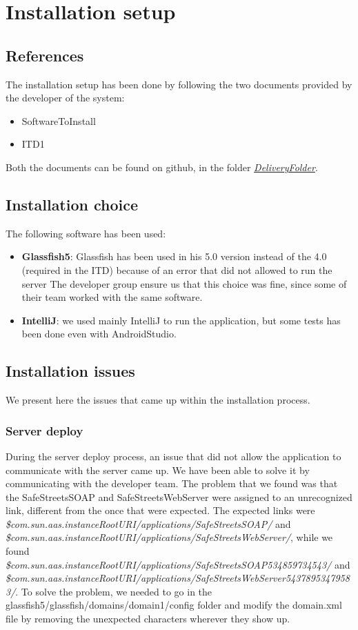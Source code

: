 \documentclass[../ATD.tex]{subfiles}
\begin{document}
    \chapter{Installation setup}\label{ch:installation-setup}
    \section{References}\label{sec:references}
    The installation setup has been done by following the two documents provided by the developer of the system:
    \begin{itemize}
        \item SoftwareToInstall
        \item ITD1
    \end{itemize}
    Both the documents can be found on github, in the folder \href{https://github.com/gianfi12/AbboAccordiBonetti/DeliveryFolder}{\emph{DeliveryFolder}}.


    \section{Installation choice}\label{sec:installation-choice}
    The following software has been used:
    \begin{itemize}
        \item \textbf{Glassfish5}: Glassfish has been used in his 5.0 version instead of the 4.0 (required in the ITD) because of an error that did not allowed to run the server
        The developer group ensure us that this choice was fine, since some of their team worked with the same software.
        \item \textbf{IntelliJ}: we used mainly IntelliJ to run the application, but some tests has been done even with AndroidStudio.
    \end{itemize}

    \section{Installation issues}\label{sec:installation-issues}
    We present here the issues that came up within the installation process.
    \subsection{Server deploy}\label{subsec:server-deploy}
    During the server deploy process, an issue that did not allow the application to communicate with the server came up.
    We have been able to solve it by communicating with the developer team.
    The problem that we found was that the SafeStreetsSOAP and SafeStreetsWebServer were assigned to an unrecognized link, different from the once that were expected.
    The expected links were \textit{\${com.sun.aas.instanceRootURI}/applications/SafeStreetsSOAP/} and \textit{\${com.sun.aas.instanceRootURI}/applications/SafeStreetsWebServer/},
    while we found \textit{\${com.sun.aas.instanceRootURI}/applications/SafeStreetsSOAP534859734543/} and \textit{\${com.sun.aas.instanceRootURI}/applications/SafeStreetsWebServer54378953479583/}.
    To solve the problem, we needed to go in the glassfish5/glassfish/domains/domain1/config folder and modify the domain.xml file by removing the unexpected characters wherever they show up.
\end{document}
